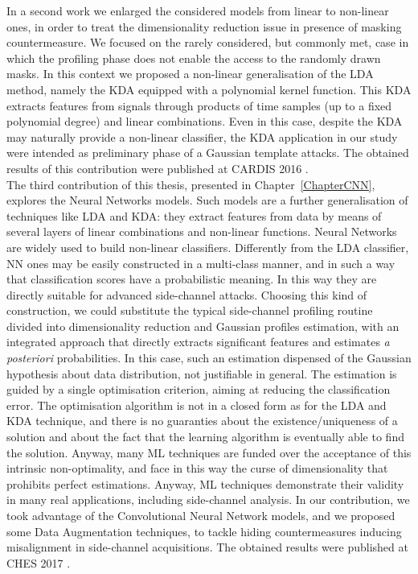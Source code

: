 In a second work we enlarged the considered models from linear to non-linear ones, in order to treat the dimensionality reduction issue in presence of masking countermeasure. We focused on the rarely considered, but commonly met, case in which the profiling phase does not enable the access to the randomly drawn masks. In this context we proposed a non-linear generalisation  of the LDA method, namely the KDA equipped with a polynomial kernel function. This KDA extracts features from signals through products of time samples (up to a fixed polynomial degree) and linear combinations. Even in this case, despite the KDA may naturally provide a non-linear classifier, the KDA application in our study were intended as preliminary phase of a Gaussian template attacks. The obtained results of this contribution were published at CARDIS 2016 \cite{cagli2016kernel}.\\


 The third contribution of this thesis, presented in Chapter~\ref{ChapterCNN}, explores the Neural Networks models. Such models are a further generalisation of techniques like LDA and KDA: they extract features from data by means of several layers of linear combinations and non-linear functions. Neural Networks are widely used to build non-linear classifiers. Differently from the LDA classifier, NN ones may be easily constructed in a multi-class manner, and in such a way that classification scores have a probabilistic meaning. In this way they are directly suitable for advanced side-channel attacks. Choosing this kind of construction, we could substitute the typical side-channel profiling routine divided into dimensionality reduction and Gaussian profiles estimation, with an integrated approach that directly extracts significant features and estimates \textit{a posteriori} probabilities. In this case, such an estimation dispensed of the Gaussian hypothesis about data distribution, not justifiable in general. The estimation is guided by a single optimisation criterion, aiming at reducing the classification error. The optimisation algorithm is not in a closed form as for the LDA and KDA technique, and there is no guaranties about the existence/uniqueness of a solution and about the fact that the learning algorithm is eventually able to find the solution. Anyway, many ML techniques are funded over the acceptance of this intrinsic non-optimality, and face in this way the curse of dimensionality that prohibits perfect estimations. Anyway, ML techniques demonstrate their validity in many real applications, including side-channel analysis. In our contribution, we took advantage of the Convolutional Neural Network models, and we proposed some Data Augmentation techniques, to tackle hiding countermeasures inducing misalignment in side-channel acquisitions. The obtained results were published at CHES 2017 \cite{DBLP:conf/ches/CagliDP17}.\\
 





